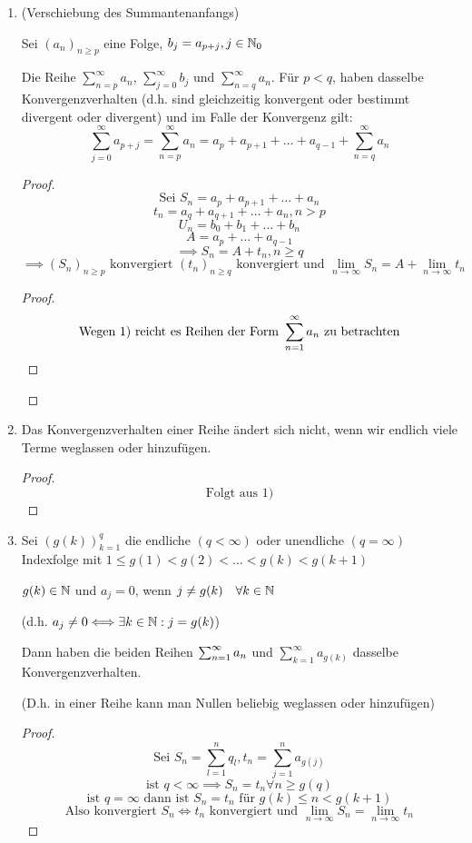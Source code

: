 \begin{enumerate}
  \item (Verschiebung des Summantenanfangs)
  
  Sei $(a_n)_{n \geq p}$ eine Folge, $b_j = a_{p+j}, j \in \mathbb{N}_0$
  
  Die Reihe $\sum_{n=p}^\infty a_n$, $\sum_{j=0}^\infty b_j$ und $\sum_{n=q}^\infty a_n$. Für $p < q$, haben dasselbe Konvergenzverhalten (d.h. sind gleichzeitig konvergent oder bestimmt divergent oder divergent) und im Falle der Konvergenz gilt:
  \[\sum_{j=0}^\infty a_{p+j} = \sum_{n=p}^\infty a_n = a_p + a_{p+1} + \ldots + a_{q-1} + \sum_{n=q}^\infty a_n \]
  
  \begin{proof}
    \[\text{Sei } S_n = a_p + a_{p+1} + \ldots + a_n\]
    \[t_n = a_q + a_{q+1} + \ldots + a_n,n > p\]
    \[U_n = b_0 + b_1 + \ldots + b_n\]
    \[A = a_p+ \ldots + a_{q-1}\]
    \[\implies S_n = A+ t_n, n\geq q\]
    \[\implies (S_n)_{n\geq p} \text{ konvergiert } (t_n)_{n\geq q} \text{ konvergiert und } \lim_{n\to \infty} S_n = A + \lim_{n\to \infty} t_n\]
    \begin{proof}
      \[\text{Wegen 1) reicht es Reihen der Form } \sum_{n=1}^{\infty} a_n \text{ zu betrachten} \]
    \end{proof}
  \end{proof}  
  
  \item Das Konvergenzverhalten einer Reihe ändert sich nicht, wenn wir endlich viele Terme weglassen oder hinzufügen.
  
  \begin{proof}
    \[\text{Folgt aus 1)}\]
  \end{proof}    
  
  \item Sei $(g(k))_{k=1}^q$ die endliche $(q<\infty)$ oder unendliche $(q=\infty)$ Indexfolge mit $1\leq g(1) < g(2) < \ldots < g(k) < g(k+1)$
  
  $g(k)\in \mathbb{N}$ und $a_j=0$, wenn $j \neq g(k) \quad \forall k \in \mathbb{N}$
  
  (d.h. $a_j \neq 0 \Longleftrightarrow \exists k \in \mathbb{N}: j=g(k)$)
  
  Dann haben die beiden Reihen $\sum_{n=1}^{\infty} a_n$ und $\sum_{k=1}^\infty a_{g(k)}$ dasselbe Konvergenzverhalten.
  
  (D.h. in einer Reihe kann man Nullen beliebig weglassen oder hinzufügen)
  
  \begin{proof}
    \[\text{Sei } S_n=\sum_{l=1}^n q_l, t_n = \sum_{j=1}^n a_{g(j)}\]
    \[\text{ist } q<\infty \implies S_n = t_n \forall n \geq g(q)\]
    \[\text{ist } q=\infty \text{ dann ist } \boxed{S_n =t_n \text{ für } g(k)\leq n< g(k+1)}\]
    \[\text{Also konvergiert } S_n \Longleftrightarrow t_n \text{ konvergiert und } \lim_{n\to \infty} S_n = \lim_{n \to \infty} t_n\]
  \end{proof}
\end{enumerate}

